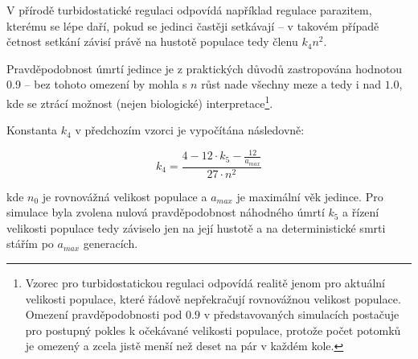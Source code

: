 V přírodě turbidostatické regulaci odpovídá například regulace parazitem, kterému se lépe daří,
pokud se jedinci častěji setkávají -- v takovém případě četnost setkání závisí právě na hustotě populace tedy členu
$k_4 n^2$.

Pravděpodobnost úmrtí jedince je z praktických důvodů zastropována hodnotou 0.9 --
bez tohoto omezení by mohla s $n$ růst nade všechny meze a tedy i nad $1.0$,
kde se ztrácí možnost (nejen biologické) interpretace\footnote{
Vzorec pro turbidostatickou regulaci odpovídá realitě jenom pro aktuální velikosti populace,
které řádově nepřekračují rovnovážnou velikost populace. Omezení pravděpodobnosti pod $0.9$ v představovaných
simulacích postačuje pro postupný pokles k očekávané velikosti populace, protože počet potomků je omezený a
zcela jistě menší než deset na pár v každém kole.
}.

Konstanta $k_4$ v předchozím vzorci je vypočítána následovně:

\begin{equation}
k_4 = \frac{4 - 12\cdot{}{k_5} - \frac{12}{a_{max}}}
           {27\cdot{}n^2}
\end{equation}


kde $n_0$ je rovnovážná velikost populace a $a_{max}$ je maximální věk jedince.
Pro simulace byla zvolena nulová pravděpodobnost náhodného úmrtí $k_5$ a řízení velikosti populace tedy záviselo jen na
její hustotě a na deterministické smrti stářím po $a_{max}$ generacích.

